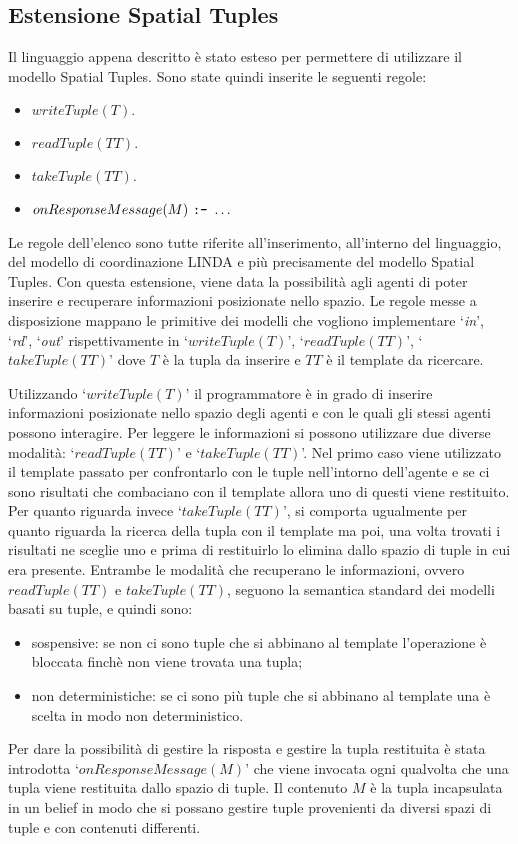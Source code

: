 \subsection{Estensione Spatial Tuples}
Il linguaggio appena descritto è stato esteso per permettere di utilizzare il modello Spatial Tuples. Sono state quindi inserite le seguenti regole:
\begin{itemize}
\item $writeTuple(T).$
\item $readTuple(TT).$
\item $takeTuple(TT).$
\item $onResponseMessage(M) \ \text{\texttt{:-}}\  \ldots$
\end{itemize}
Le regole dell'elenco sono tutte riferite all'inserimento, all'interno del linguaggio, del modello di coordinazione LINDA e più precisamente del modello Spatial Tuples.
Con questa estensione, viene data la possibilità agli agenti di poter inserire e recuperare informazioni posizionate nello spazio. Le regole messe a disposizione mappano le primitive dei modelli che vogliono implementare `\textit{in}', `\textit{rd}', `\textit{out}' rispettivamente in `$writeTuple(T)$', `$readTuple(TT)$', `$takeTuple(TT)$' dove $T$ è la tupla da inserire e $TT$ è il template da ricercare.

Utilizzando `$writeTuple(T)$' il programmatore è in grado di inserire informazioni posizionate nello spazio degli agenti e con le quali gli stessi agenti possono interagire. Per leggere le informazioni si possono utilizzare due diverse modalità: `$readTuple(TT)$' e `$takeTuple(TT)$'. Nel primo caso viene utilizzato il template passato per confrontarlo con le tuple nell'intorno dell'agente e se ci sono risultati che combaciano con il template allora uno di questi viene restituito. Per quanto riguarda invece `$takeTuple(TT)$', si comporta ugualmente per quanto riguarda la ricerca della tupla con il template ma poi, una volta trovati i risultati ne sceglie uno e prima di restituirlo lo elimina dallo spazio di tuple in cui era presente.
%
Entrambe le modalità che recuperano le informazioni, ovvero $readTuple(TT)$ e $takeTuple(TT)$, seguono la semantica standard dei modelli basati su tuple, e quindi sono:
\begin{itemize}
\item sospensive: se non ci sono tuple che si abbinano al template l'operazione è bloccata finchè non viene trovata una tupla;
\item non deterministiche: se ci sono più tuple che si abbinano al template una è scelta in modo non deterministico.
\end{itemize}
Per dare la possibilità di gestire la risposta e gestire la tupla restituita è stata introdotta `$onResponseMessage(M)$' che viene invocata ogni qualvolta che una tupla viene restituita dallo spazio di tuple. Il contenuto $M$ è la tupla incapsulata in un belief in modo che si possano gestire tuple provenienti da diversi spazi di tuple e con contenuti differenti.

